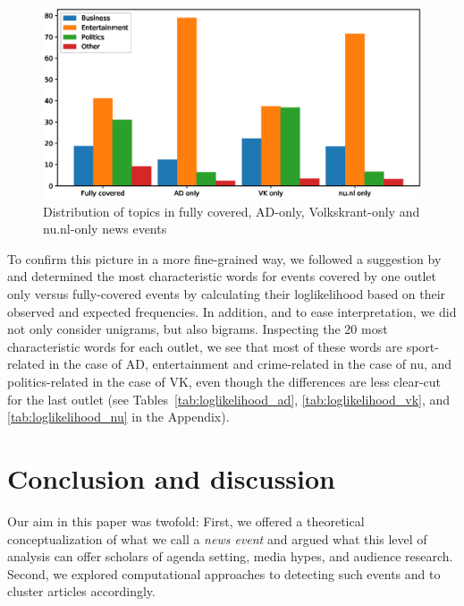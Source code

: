 \documentclass[a4paper,man,natbib,floatsintext,mask]{apa6}
\begin{document}
\begin{figure}
    \centering
    \includegraphics[width=\linewidth]{figures/classification.eps}
    \caption{Distribution of topics in fully covered, AD-only, Volkskrant-only and nu.nl-only news events}
    \label{fig:bar_topics}
\end{figure}

To confirm this picture in a more fine-grained way, we followed a suggestion by \citet{Rayson2000} and determined the most characteristic words for events covered by one outlet only versus fully-covered events by calculating their loglikelihood based on their observed and expected frequencies. 
In addition, and to ease interpretation, we did not only consider unigrams, but also bigrams.
Inspecting the 20 most characteristic words for each outlet, we see that most of these words are sport-related in the case of AD, entertainment and crime-related in the case of nu, and politics-related in the case of VK, even though the differences are less clear-cut for the last outlet (see Tables~\ref{tab:loglikelihood_ad}, \ref{tab:loglikelihood_vk}, and \ref{tab:loglikelihood_nu} in the Appendix).









\section{Conclusion and discussion}

Our aim in this paper was twofold: First, we offered a theoretical conceptualization of what we call a \emph{news event} and argued what this level of analysis can offer scholars of agenda setting, media hypes, and audience research.
Second, we explored computational approaches to detecting such events and to cluster articles accordingly. 
\end{document}

